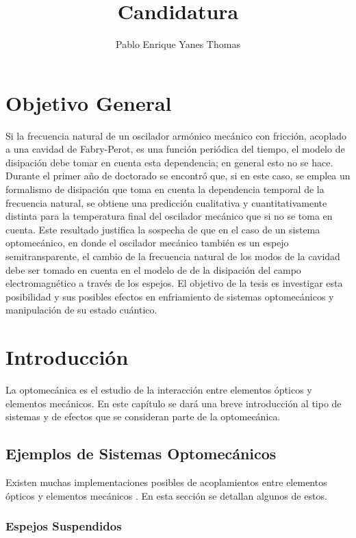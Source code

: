 \documentclass[10pt,a4paper]{report}
\author{Pablo Enrique Yanes Thomas}
\title{Candidatura}
\begin{document}
\tableofcontents
\chapter*{Objetivo General}
Si la frecuencia natural de un oscilador armónico mecánico con
fricción, acoplado a una cavidad de Fabry-Perot, es una
función periódica del tiempo, el modelo de disipación
 debe tomar en cuenta esta dependencia; en
general esto no se hace. Durante el primer año de doctorado se
encontró que, si en este caso, se emplea un formalismo de disipación
que toma en cuenta la dependencia temporal de la frecuencia natural,
se obtiene una predicción cualitativa y cuantitativamente distinta
para la temperatura final del oscilador mecánico que si no se toma en
cuenta. Este resultado justifica la sospecha de que en el caso de un
sistema optomecánico, en donde el oscilador mecánico también es un
espejo semitransparente, el cambio de la frecuencia natural de los
modos de la cavidad debe ser tomado en cuenta en el modelo de
de la disipación del campo electromagnético a través
de los espejos. El objetivo de la tesis es investigar esta posibilidad
y sus posibles efectos en enfriamiento de sistemas optomecánicos y
manipulación de su estado cuántico.


\chapter{Introducción}

La optomecánica es el estudio de la interacción entre elementos ópticos y elementos mecánicos. En este capítulo se dará una breve introducción al tipo de sistemas y de efectos que se consideran parte de la optomecánica. 


\section{Ejemplos de Sistemas Optomecánicos}

Existen muchas implementaciones posibles de acoplamientos entre elementos ópticos y elementos mecánicos \cite{KippenberCO}. En esta sección se detallan algunos de estos.

\subsection{Espejos Suspendidos}
\end{document}
